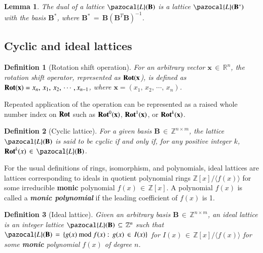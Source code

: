 \documentclass[10pt]{elsarticle}
\newtheorem{lemma}{Lemma}
\newtheorem{definition}{Definition}
\begin{document}
\begin{lemma}
\normalfont  The dual of a lattice $\pazocal{L}(\mathbf{B})$ is a
lattice $\pazocal{L}(\mathbf{B}^{*})$ with the basis
$\mathbf{B}^{*}$, where $\mathbf{B}^{*} \, = \,
\mathbf{B}(\mathbf{B}^{T} \mathbf{B})^{-1}$.
\end{lemma}


\subsection{Cyclic and ideal lattices}

\begin{definition}[Rotation shift operation]
\normalfont  For an arbitrary vector $\mathbf{x} \, \in \,
\mathbb{R}^{n}$, the rotation shift operator, represented as
$\mbox{\textbf{Rot}}(\mathbf{x}$), is defined as
$\mbox{\textbf{Rot}}(\mathbf{x}) = x_{n}, \, x_{1}, \, x_{2}, \,
\cdots, x_{n-1}$, where $\mathbf{x} = (x_{1}, \, x_{2}, \, \cdots,
\, x_{n})$.
\end{definition}

Repeated application of the operation can be represented as a raised
whole number index on $\mbox{\textbf{Rot}}$ such as
$\mbox{\textbf{Rot}}^{0}(\mathbf{x})$,
$\mbox{\textbf{Rot}}^{1}(\mathbf{x})$, or
$\mbox{\textbf{Rot}}^{k}(\mathbf{x})$.

\begin{definition}[Cyclic lattice]
\normalfont  For a given basis $\mathbf{B} \, \in \, \mathbb{Z}^{n
\times m}$, the lattice $\pazocal{L}(\mathbf{B})$ is said to be
cyclic if and only if, for any positive integer $k$,
$\mbox{\textbf{Rot}}^{k}(x) \, \in \, \pazocal{L}(\mathbf{B})$.
\end{definition}

For the usual definitions of rings, isomorphism, and polynomials,
ideal lattices are lattices corresponding to ideals in quotient
polynomial rings $\mathbb{Z}[x]/ \langle f(x) \rangle$ for some
irreducible \textbf{monic} polynomial $f(x)\,\in\,\mathbb{Z}[x]$. A
polynomial $f(x)$ is called a \emph{\textbf{monic polynomial}} if
the leading coefficient of $f(x)$ is 1.

\begin{definition}[Ideal lattice]
\normalfont  Given an arbitrary basis $\mathbf{B} \, \in \,
\mathbb{Z}^{n \times m}$, an ideal lattice is an integer lattice
$\pazocal{L}(\mathbf{B}) \, \subseteq \,\mathbb{Z}^{n}$ such that
$\pazocal{L}(\mathbf{B})\, = \,
\{g(x)~\mbox{mod}~f(x):\,g(x)\,\in\,I(x)\}$ for
$I(x)\,\in\,\mathbb{Z}[x]/\langle f(x)\rangle$ for some
\textit{\textbf{monic}} polynomial $f(x)$ of degree $n$.
\end{definition}
\end{document}
